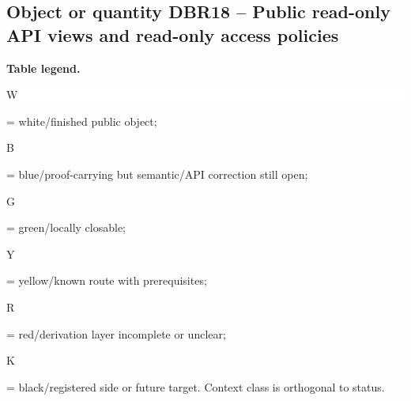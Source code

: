 \subsection*{Object or quantity DBR18 -- Public read-only API views and read-only access policies}
\hypertarget{objproof:DBR18}{}
\par\smallskip\noindent\begin{minipage}{0.99\linewidth}\footnotesize\raggedright\textbf{Table legend.} \colorbox{white}{\strut W} = white/finished public object; \colorbox{cyan!20}{\strut B} = blue/proof-carrying but semantic/API correction still open; \colorbox{green!18}{\strut G} = green/locally closable; \colorbox{yellow!25}{\strut Y} = yellow/known route with prerequisites; \colorbox{red!20}{\strut R} = red/derivation layer incomplete or unclear; \colorbox{black!18}{\strut K} = black/registered side or future target. Context class is orthogonal to status.\end{minipage}\par\vspace{0.25em}
